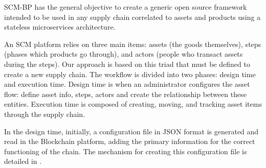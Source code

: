 \label{chap:Technical}

\acresetall 

\ac{SCM-BP} has the general objective to create a generic open source framework intended to be used in any supply chain correlated to assets and products using a stateless microservices architecture. 

An SCM platform relies on three main items: assets (the goods themselves), steps (phases which products go through), and actors (people who transact assets during the steps). Our approach is based on this triad that must be defined to create a new supply chain. The workflow is divided into two phases: design time and execution time. Design time is when an administrator configures the asset flow: define asset info, steps, actors and create the relationship between these entities. Execution time is composed of creating, moving, and tracking asset items through the supply chain.

In the design time, initially, a configuration file in JSON format is generated and read in the Blockchain platform, adding the primary information for the correct functioning of the chain. The mechanism for creating this configuration file is detailed in .






%

%
%